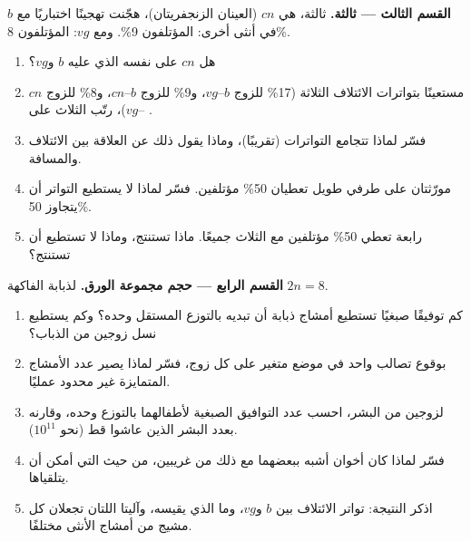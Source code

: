 \begin{problem}
\medskip
\noindent\textbf{القسم الثالث ---  ثالثة.}
 ثالثة، هي $cn$ (العينان الزنجفريتان)، هجّنت تهجينًا اختباريًا مع
$b$ في أنثى أخرى: المؤتلفون 9\%. ومع $vg$: المؤتلفون 8\%.
\begin{enumerate}[resume]
  \item هل $cn$ على  نفسه الذي عليه $b$ و$vg$؟
  \item مستعينًا بتواترات الائتلاف الثلاثة (17\% للزوج $b$--$vg$،
        و9\% للزوج $b$--$cn$، و8\% للزوج $cn$--$vg$)، رتّب 
        الثلاث على .
  \item فسّر لماذا تتجامع التواترات (تقريبًا)، وماذا يقول ذلك عن العلاقة
        بين الائتلاف والمسافة.
  \item مورّثتان على طرفي  طويل تعطيان 50\% مؤتلفين. فسّر لماذا لا
        يستطيع التواتر أن يتجاوز 50\%.
  \item {} رابعة تعطي 50\% مؤتلفين مع الثلاث جميعًا. ماذا تستنتج،
        وماذا لا تستطيع أن تستنتج؟
\end{enumerate}

\medskip
\noindent\textbf{القسم الرابع --- حجم مجموعة الورق.}
لذبابة الفاكهة $2n = 8$.
\begin{enumerate}[resume]
  \item كم توفيقًا صبغيًا تستطيع أمشاج ذبابة أن تبديه بالتوزع المستقل
        وحده؟ وكم يستطيع نسل زوجين من الذباب؟
  \item بوقوع تصالب واحد في موضع متغير على كل زوج، فسّر لماذا يصير عدد
        الأمشاج المتمايزة غير محدود عمليًا.
  \item لزوجين من البشر، احسب عدد التوافيق الصبغية لأطفالهما بالتوزع
        وحده، وقارنه بعدد البشر الذين عاشوا قط (نحو $10^{11}$).
  \item فسّر لماذا كان أخوان أشبه ببعضهما مع ذلك من غريبين، من حيث
         التي أمكن أن يتلقياها.
  \item اذكر النتيجة: تواتر الائتلاف بين $b$ و$vg$، وما الذي يقيسه،
        وآليتا  اللتان تجعلان كل مشيج من أمشاج الأنثى
        مختلفًا.
\end{enumerate}
\end{problem}

